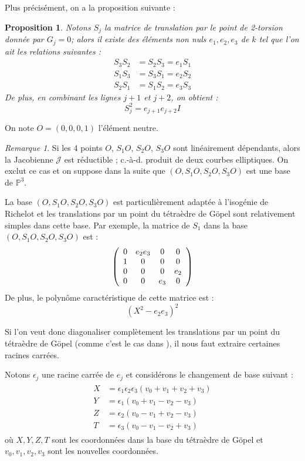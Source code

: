 \documentclass[a4paper,12pt]{article}
\newtheorem{proposition}[theoreme]{Proposition}
\theoremstyle{definition}
\theoremstyle{remark}
\newtheorem{remarque}{Remarque}
\numberwithin{equation}{section}
\begin{document}
Plus précisément, on a la proposition suivante :

\begin{proposition}
Notons $S_j$ la matrice de translation par le point de 2-torsion donnée par $G_j=0$; alors il existe des éléments non nuls $e_1,e_2,e_3$ de $k$ tel que l'on ait les relations suivantes :
\begin{align*}
S_3S_2 &= S_2S_3 = e_1S_1 \\
S_1S_3 &= S_3S_1 = e_2S_2 \\
S_2S_1 &= S_1S_2 = e_3S_3
\end{align*}
De plus, en combinant les lignes $j+1$ et $j+2$, on obtient :
$$S_j^2 = e_{j+1}e_{j+2}I$$
\end{proposition}

On note $O=(0,0,0,1)$ l'élément neutre.
\begin{remarque}
Si les 4 points $O$, $S_1O$, $S_2O$, $S_3O$ sont linéairement dépendants, alors la Jacobienne $\mathcal{J}$ est réductible \citep{cassels-Flynn}; c.-à-d. produit de deux courbes elliptiques. On exclut ce cas et on suppose dans la suite que $(O,S_1O,S_2O,S_3O)$ est une base de $\mathbb{P}^3$.
\end{remarque}

La base $(O,S_1O,S_2O,S_3O)$ est particulièrement adaptée à l'isogénie de Richelot et les translations par un point du tétraèdre de G\"opel sont relativement simples dans cette base. Par exemple, la matrice de $S_1$ dans la base  $(O,S_1O,S_2O,S_3O)$ est :
\[ \left(
  \begin{array}{ c c c c}
     0 & e_2e_3 & 0  & 0  \\
     1 & 0   & 0  & 0  \\
     0 & 0   & 0  & e_2 \\
     0 & 0   & e_3  & 0  \\
  \end{array} \right)
\]
De plus, le polynôme caractéristique de cette matrice est :
$$(X^2-e_2e_3)^2$$

Si l'on veut donc diagonaliser complètement les translations par un point du tétraèdre de G\"opel (comme c'est le cas dans \citep{gaudry}), il nous faut extraire certaines racines carrées.

Notons $\epsilon_j$ une racine carrée de $e_j$ et considérons le changement de base suivant \citep{cassels-Flynn} :
\begin{align}
\begin{split}
\label{chgBase}
X &= \epsilon_1\epsilon_2\epsilon_3(v_0+v_1+v_2+v_3) \\
Y &= \epsilon_1(v_0+v_1-v_2-v_3) \\
Z &= \epsilon_2(v_0-v_1+v_2-v_3) \\
T &= \epsilon_3(v_0-v_1-v_2+v_3)
\end{split}
\end{align}
où $X,Y,Z,T$ sont les coordonnées dans la base du tétraèdre de G\"opel et $v_0,v_1,v_2,v_3$ sont les nouvelles coordonnées.
\end{document}
